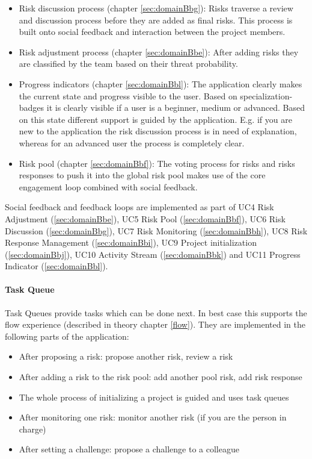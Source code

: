 \begin{itemize}
	\item Risk discussion process (chapter \ref{sec:domainBbg}): Risks traverse a review and discussion process before they are added as final risks. This process is built onto social feedback and interaction between the project members.
	\item Risk adjustment process (chapter \ref{sec:domainBbe}): After adding risks they are classified by the team based on their threat probability.
	\item Progress indicators (chapter \ref{sec:domainBbl}): The application clearly makes the current state and progress visible to the user. Based on specialization-badges it is clearly visible if a user is a beginner, medium or advanced. Based on this state different support is guided by the application. E.g. if you are new to the application the risk discussion process is in need of explanation, whereas for an advanced user the process is completely clear.
	\item Risk pool (chapter \ref{sec:domainBbf}): The voting process for risks and risks responses to push it into the global risk pool makes use of the core engagement loop combined with social feedback.
\end{itemize}

Social feedback and feedback loops are implemented as part of \ac{UC}4 Risk Adjustment (\ref{sec:domainBbe}), \ac{UC}5 Risk Pool (\ref{sec:domainBbf}), \ac{UC}6 Risk Discussion (\ref{sec:domainBbg}), \ac{UC}7 Risk Monitoring (\ref{sec:domainBbh}), \ac{UC}8 Risk Response Management (\ref{sec:domainBbi}), \ac{UC}9 Project initialization (\ref{sec:domainBbj}), \ac{UC}10 Activity Stream (\ref{sec:domainBbk}) and \ac{UC}11 Progress Indicator (\ref{sec:domainBbl}).

\paragraph*{Task Queue}

Task Queues provide tasks which can be done next. In best case this supports the flow experience (described in theory chapter \ref{flow}).
They are implemented in the following parts of the application:
\begin{itemize}
	\item After proposing a risk: propose another risk, review a risk
	\item After adding a risk to the risk pool: add another pool risk, add risk response
	\item The whole process of initializing a project is guided and uses task queues
	\item After monitoring one risk: monitor another risk (if you are the person in charge)
	\item After setting a challenge: propose a challenge to a colleague
\end{itemize}

